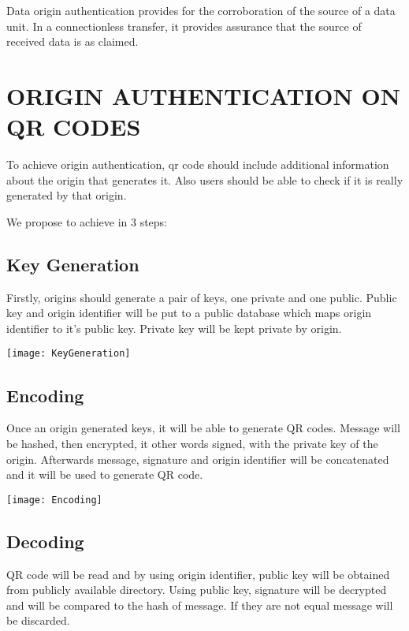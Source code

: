 \documentclass[12pt,journal,compsoc]{IEEEtran}
\begin{document}
Data origin authentication provides for the corroboration of the source
of a data unit. In a connectionless transfer, it provides assurance that
the source of received data is as claimed.


\section{ORIGIN AUTHENTICATION ON QR CODES}

To achieve origin authentication, qr code should include additional information about the origin that generates it. Also users should be able to check if it is really generated by that origin.

We propose to achieve in 3 steps: 


\subsection{Key Generation}

Firstly, origins should generate a pair of keys, one private and one public. Public key and origin identifier will be put to a public database which maps origin identifier to it's public key. Private key will be kept private by origin.


\begin{center}
\texttt{[image: KeyGeneration]}
\end{center}

\subsection{Encoding}

Once an origin generated keys, it will be able to generate QR codes. Message will be hashed, then encrypted, it other words signed, with the private key of the origin. Afterwards message, signature and origin identifier will be concatenated and it will be used to generate QR code.

\begin{center}
\texttt{[image: Encoding]}
\end{center}


\subsection{Decoding}

QR code will be read and by using origin identifier, public key will be obtained from publicly available directory. Using public key, signature will be decrypted and will be compared to the hash of message. If they are not equal message will be discarded. 
\end{document}
